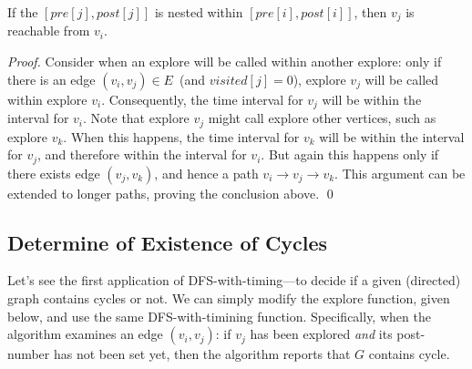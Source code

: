 \begin{claim}
If the $[pre[j], post[j]]$ is nested within $[pre[i], post[i]]$, then $v_j$ is reachable from $v_i$.
\label{claim:path}
\end{claim}

\emph{Proof.} 
Consider when an explore will be called within another explore: 
only if there is an edge $(v_i, v_j)\in E$~(and $visited[j] = 0$), explore $v_j$ will be called within explore $v_i$.
Consequently, the time interval for $v_j$ will be within the interval for $v_i$.
Note that explore $v_j$ might call explore other vertices, such as explore $v_k$.
When this happens, the time interval for $v_k$ will be within the interval for $v_j$, and therefore within
the interval for $v_i$.  
But again this happens only if there exists edge $(v_j, v_k)$, and hence a path $v_i \to v_j \to v_k$.
This argument can be extended to longer paths, proving the conclusion above. \qed


\subsection*{Determine of Existence of Cycles}

Let's see the first application of DFS-with-timing---to decide if a given (directed) graph contains cycles or not.
We can simply modify the explore function, given below, and use the same DFS-with-timining function.
Specifically, when the algorithm examines an edge $(v_i, v_j)$:
if $v_j$ has been explored \emph{and} its post-number has not been set yet,
then the algorithm reports that $G$ contains cycle.


\begin{algorithmblock}[0.8\textwidth]
	\xxx
	\xxx
	\xxx
	\xxx
	\xxx
	\xxx
	\aac {\textcolor{red}{else if ($post[j] = -1$): report ``$G$ contains cycle''};}\xxx
	\xxx
	\xxx
	\xxx
\end{algorithmblock}


